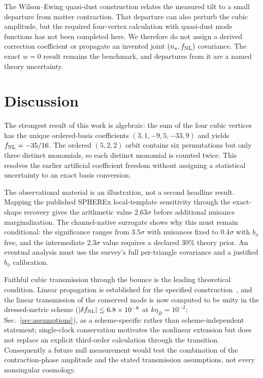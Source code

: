 \documentclass[aps,prd,twocolumn,superscriptaddress,showpacs,preprintnumbers,nofootinbib,longbibliography,floatfix]{revtex4-2}
\newcommand{\fnl}{f_{\rm NL}}
\begin{document}
The Wilson--Ewing quasi-dust construction relates the measured tilt to a small departure from matter contraction. That departure can also perturb the cubic amplitude, but the required four-vertex calculation with quasi-dust mode functions has not been completed here. We therefore do not assign a derived correction coefficient or propagate an invented joint $(n_s,\fnl)$ covariance. The exact $w=0$ result remains the benchmark, and departures from it are a named theory uncertainty.

\section{Discussion}
\label{sec:discussion}

The strongest result of this work is algebraic: the sum of the four cubic vertices has the unique ordered-basis coefficients $(3,1,-9,5,-33,9)$ and yields $\fnl=-35/16$. The ordered $(5,2,2)$ orbit contains six permutations but only three distinct monomials, so each distinct monomial is counted twice. This resolves the earlier artificial coefficient freedom without assigning a statistical uncertainty to an exact basis conversion.

The observational material is an illustration, not a second headline result. Mapping the published SPHEREx local-template sensitivity through the exact-shape recovery gives the arithmetic value $2.63\sigma$ before additional nuisance marginalization. The channel-native surrogate shows why this must remain conditional: the significance ranges from $3.5\sigma$ with nuisances fixed to $0.4\sigma$ with $b_\phi$ free, and the intermediate $2.3\sigma$ value requires a declared 30\% theory prior. An eventual analysis must use the survey's full per-triangle covariance and a justified $b_\phi$ calibration.

Faithful cubic transmission through the bounce is the leading theoretical condition. Linear propagation is established for the specified construction~\cite{WilsonEwing:2012}, and the linear transmission of the conserved mode is now computed to be unity in the dressed-metric scheme ($|\delta\fnl|\le6.8\times10^{-8}$ at $k\eta_B=10^{-2}$; Sec.~\ref{sec:assumptions}), as a scheme-specific rather than scheme-independent statement; single-clock conservation motivates the nonlinear extension but does not replace an explicit third-order calculation through the transition. Consequently a future null measurement would test the combination of the contraction-phase amplitude and the stated transmission assumptions, not every nonsingular cosmology.
\end{document}
